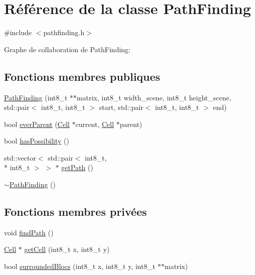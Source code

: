 \hypertarget{class_path_finding}{\section{Référence de la classe Path\-Finding}
\label{class_path_finding}
}


{\ttfamily \#include $<$pathfinding.\-h$>$}



Graphe de collaboration de Path\-Finding\-:
\subsection*{Fonctions membres publiques}
\begin{DoxyCompactItemize}
\item 
\hyperlink{class_path_finding_a886575c3dc169578626ba9dbf45744be}{Path\-Finding} (int8\-\_\-t $\ast$$\ast$matrix, int8\-\_\-t width\-\_\-scene, int8\-\_\-t height\-\_\-scene, std\-::pair$<$ int8\-\_\-t, int8\-\_\-t $>$ start, std\-::pair$<$ int8\-\_\-t, int8\-\_\-t $>$ end)
\item 
bool \hyperlink{class_path_finding_a3ff60b1cb0a54bfd10dbc75bfce9b47d}{ever\-Parent} (\hyperlink{class_cell}{Cell} $\ast$current, \hyperlink{class_cell}{Cell} $\ast$parent)
\item 
bool \hyperlink{class_path_finding_a8d70d17f06400cdcd5787331d7be38e2}{has\-Possibility} ()
\item 
std\-::vector$<$ std\-::pair$<$ int8\-\_\-t, \\*
int8\-\_\-t $>$ $>$ $\ast$ \hyperlink{class_path_finding_a536055d11c630edc210d100d832a5ccf}{get\-Path} ()
\item 
\hyperlink{class_path_finding_a0fc7389a32fa31a194a940a89f252bdb}{$\sim$\-Path\-Finding} ()
\end{DoxyCompactItemize}
\subsection*{Fonctions membres privées}
\begin{DoxyCompactItemize}
\item 
void \hyperlink{class_path_finding_addc7b9eb5682e0de46fd59c4a1319a86}{find\-Path} ()
\item 
\hyperlink{class_cell}{Cell} $\ast$ \hyperlink{class_path_finding_a41966230b75e9e6e680b2ca0ac820399}{get\-Cell} (int8\-\_\-t x, int8\-\_\-t y)
\item 
bool \hyperlink{class_path_finding_ade7cf2d6ced4a0d586ff7ebe3639f26d}{surrounded\-Blocs} (int8\-\_\-t x, int8\-\_\-t y, int8\-\_\-t $\ast$$\ast$matrix)
\end{DoxyCompactItemize}
